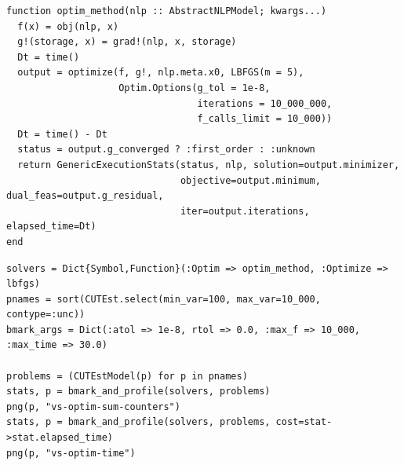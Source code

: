 \begin{frame}
\begin{lstlisting}
function optim_method(nlp :: AbstractNLPModel; kwargs...)
  f(x) = obj(nlp, x)
  g!(storage, x) = grad!(nlp, x, storage)
  Dt = time()
  output = optimize(f, g!, nlp.meta.x0, LBFGS(m = 5),
                    Optim.Options(g_tol = 1e-8,
                                  iterations = 10_000_000,
                                  f_calls_limit = 10_000))
  Dt = time() - Dt
  status = output.g_converged ? :first_order : :unknown
  return GenericExecutionStats(status, nlp, solution=output.minimizer,
                               objective=output.minimum, dual_feas=output.g_residual,
                               iter=output.iterations, elapsed_time=Dt)
end
\end{lstlisting}
\end{frame}

\begin{frame}
\begin{lstlisting}
solvers = Dict{Symbol,Function}(:Optim => optim_method, :Optimize => lbfgs)
pnames = sort(CUTEst.select(min_var=100, max_var=10_000, contype=:unc))
bmark_args = Dict(:atol => 1e-8, rtol => 0.0, :max_f => 10_000, :max_time => 30.0)

problems = (CUTEstModel(p) for p in pnames)
stats, p = bmark_and_profile(solvers, problems)
png(p, "vs-optim-sum-counters")
stats, p = bmark_and_profile(solvers, problems, cost=stat->stat.elapsed_time)
png(p, "vs-optim-time")
\end{lstlisting}
\end{frame}

